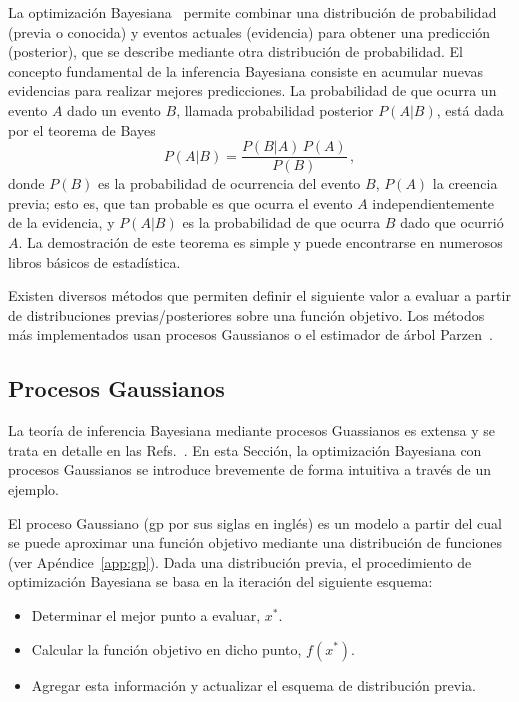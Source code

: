 La optimización Bayesiana~\cite{Gelman:13,Barber:12} permite combinar 
una distribución de probabilidad (previa o conocida) y eventos actuales 
(evidencia) para obtener una predicción (posterior), que se describe 
mediante otra distribución de probabilidad. El concepto fundamental de 
la inferencia Bayesiana consiste en acumular nuevas evidencias para 
realizar mejores predicciones. La probabilidad de que ocurra un evento 
$A$ dado un evento $B$, llamada probabilidad posterior $P(A|B)$, está 
dada por el teorema de Bayes 
\begin{equation}
P(A|B)=\frac{P(B|A)\,P(A)}{P(B)}\,,
\end{equation}
donde $P(B)$ es la probabilidad de ocurrencia del evento $B$, $P(A)$ la
creencia previa; esto es, que tan probable es que ocurra el evento $A$
independientemente de la evidencia, y $P(A|B)$ es la probabilidad de que
ocurra $B$ dado que ocurrió $A$. La demostración de este teorema es 
simple y puede encontrarse en numerosos libros básicos de estadística. 

Existen diversos métodos que permiten definir el siguiente valor a 
evaluar a partir de distribuciones previas/posteriores sobre una función 
objetivo. Los métodos más implementados usan procesos Gaussianos o el 
estimador de árbol Parzen~\cite{Bergstra:11}.

\subsection{Procesos Gaussianos}

La teoría de inferencia Bayesiana mediante procesos Guassianos es 
extensa y se trata en detalle en las Refs.~\cite{Rasmussen:06,Murphy:12}. 
En esta Sección, la optimización Bayesiana con procesos Gaussianos se 
introduce brevemente de forma intuitiva a través de un ejemplo. 

El proceso Gaussiano (\acs{gp} por sus siglas en inglés) es un modelo a 
partir del cual se puede aproximar una función objetivo mediante una
distribución de funciones (ver Apéndice~\ref{app:gp}). Dada una 
distribución previa, el procedimiento de optimización Bayesiana se basa
en la iteración del siguiente esquema:
\begin{itemize}
\item Determinar el mejor punto a evaluar, $x^*$.
\item Calcular la función objetivo en dicho punto, $f(x^*)$.
\item Agregar esta información y actualizar el esquema de distribución
previa.
\end{itemize}

